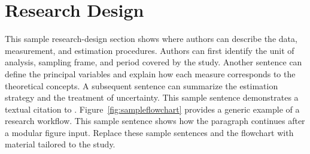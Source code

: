 \section{Research Design} 
\label{sec:research-design}

This sample research-design section shows where authors can describe the data, measurement, and estimation procedures. Authors can first identify the unit of analysis, sampling frame, and period covered by the study. Another sentence can define the principal variables and explain how each measure corresponds to the theoretical concepts. A subsequent sentence can summarize the estimation strategy and the treatment of uncertainty. This sample sentence demonstrates a textual citation to \citet{Imai2011}. Figure~\ref{fig:sampleflowchart} provides a generic example of a research workflow. This sample sentence shows how the paragraph continues after a modular figure input. Replace these sample sentences and the flowchart with material tailored to the study.

\FloatBarrier

